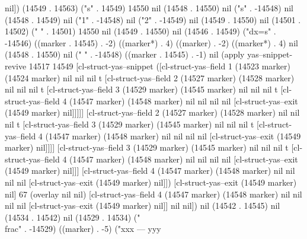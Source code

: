 nil]) (14549 . 14563) ("s" . 14549) 14550 nil (14548 . 14550) nil ("s" . -14548) nil (14548 . 14549) nil ("1" . -14548) nil ("2" . -14549) nil (14549 . 14550) nil (14501 . 14502) ("  " . 14501) 14550 nil (14549 . 14550) nil (14546 . 14549) ("dx=s" . -14546) ((marker . 14545) . -2) ((marker*) . 4) ((marker) . -2) ((marker*) . 4) nil (14548 . 14550) nil (" " . -14548) ((marker . 14545) . -1) nil (apply yas--snippet-revive 14517 14549 [cl-struct-yas--snippet ([cl-struct-yas--field 1 (14523 marker) (14524 marker) nil nil nil t [cl-struct-yas--field 2 (14527 marker) (14528 marker) nil nil nil t [cl-struct-yas--field 3 (14529 marker) (14545 marker) nil nil nil t [cl-struct-yas--field 4 (14547 marker) (14548 marker) nil nil nil nil [cl-struct-yas--exit (14549 marker) nil]]]]] [cl-struct-yas--field 2 (14527 marker) (14528 marker) nil nil nil t [cl-struct-yas--field 3 (14529 marker) (14545 marker) nil nil nil t [cl-struct-yas--field 4 (14547 marker) (14548 marker) nil nil nil nil [cl-struct-yas--exit (14549 marker) nil]]]] [cl-struct-yas--field 3 (14529 marker) (14545 marker) nil nil nil t [cl-struct-yas--field 4 (14547 marker) (14548 marker) nil nil nil nil [cl-struct-yas--exit (14549 marker) nil]]] [cl-struct-yas--field 4 (14547 marker) (14548 marker) nil nil nil nil [cl-struct-yas--exit (14549 marker) nil]]) [cl-struct-yas--exit (14549 marker) nil] 67 (overlay nil nil) [cl-struct-yas--field 4 (14547 marker) (14548 marker) nil nil nil nil [cl-struct-yas--exit (14549 marker) nil]] nil nil]) nil (14542 . 14545) nil (14534 . 14542) nil (14529 . 14534) ("\\frac" . -14529) ((marker) . -5) ("xxx
---
yyy

